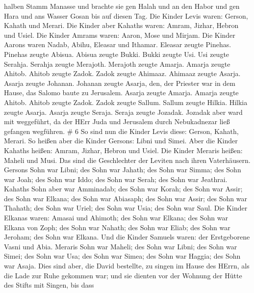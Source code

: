 halben Stamm Manasse und brachte sie gen Halah und an den Habor und gen
Hara und ans Wasser Gosan bis auf diesen Tag.  Die Kinder
Levis waren: Gerson, Kahath und Merari.  Die Kinder aber
Kahaths waren: Amram, Jizhar, Hebron und Usiel.  Die Kinder
Amrams waren: Aaron, Mose und Mirjam. Die Kinder Aarons waren Nadab,
Abihu, Eleasar und Ithamar.  Eleasar zeugte Pinehas.
Pinehas zeugte Abisua.  Abisua zeugte Bukki. Bukki zeugte
Usi.  Usi zeugte Serahja. Serahja zeugte Merajoth.
 Merajoth zeugte Amarja. Amarja zeugte Ahitob.
 Ahitob zeugte Zadok. Zadok zeugte Ahimaaz. 
Ahimaaz zeugte Asarja. Asarja zeugte Johanan.  Johanan
zeugte Asarja, den, der Priester war in dem Hause, das Salomo baute zu
Jerusalem.  Asarja zeugte Amarja. Amarja zeugte Ahitob.
 Ahitob zeugte Zadok. Zadok zeugte Sallum. 
Sallum zeugte Hilkia. Hilkia zeugte Asarja.  Asarja zeugte
Seraja. Seraja zeugte Jozadak.  Jozadak aber ward mit
weggeführt, da der HErr Juda und Jerusalem durch Nebukadnezar ließ
gefangen wegführen. \# 6  So sind nun die Kinder Levis
diese: Gerson, Kahath, Merari.  So heißen aber die Kinder
Gersons: Libni und Simei.  Aber die Kinder Kahaths heißen:
Amram, Jizhar, Hebron und Usiel.  Die Kinder Meraris heißen:
Maheli und Musi. Das sind die Geschlechter der Leviten nach ihren
Vaterhäusern.  Gersons Sohn war Libni; des Sohn war Jahath;
des Sohn war Simma;  des Sohn war Joah; des Sohn war Iddo;
des Sohn war Serah; des Sohn war Jeathrai.  Kahaths Sohn
aber war Amminadab; des Sohn war Korah; des Sohn war Assir; 
des Sohn war Elkana; des Sohn war Abiasaph; des Sohn war Assir;
 des Sohn war Thahath; des Sohn war Uriel; des Sohn war
Usia; des Sohn war Saul.  Die Kinder Elkanas waren: Amasai
und Ahimoth;  des Sohn war Elkana; des Sohn war Elkana von
Zoph; des Sohn war Nahath;  des Sohn war Eliab; des Sohn
war Jeroham; des Sohn war Elkana.  Und die Kinder Samuels
waren: der Erstgeborene Vasni und Abia.  Meraris Sohn war
Maheli; des Sohn war Libni; des Sohn war Simei; des Sohn war Usa;
 des Sohn war Simea; des Sohn war Haggia; des Sohn war
Asaja.  Dies sind aber, die David bestellte, zu singen im
Hause des HErrn, als die Lade zur Ruhe gekommen war;  und
sie dienten vor der Wohnung der Hütte des Stifts mit Singen, bis dass
